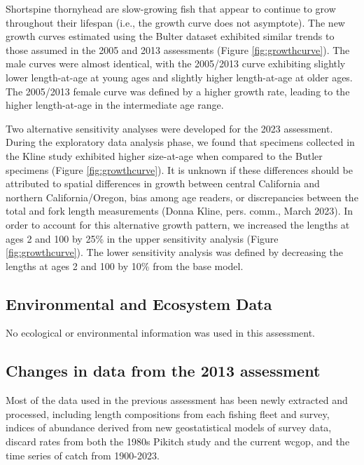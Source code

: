\documentclass[11pt,
  letterpaper,
]{article}
\begin{document}
Shortspine thornyhead are slow-growing fish that appear to continue to grow throughout their lifespan (i.e., the growth curve does not asymptote). The new growth curves estimated using the Bulter dataset exhibited similar trends to those assumed in the 2005 and 2013 assessments (Figure \ref{fig:growthcurve}). The male curves were almost identical, with the 2005/2013 curve exhibiting slightly lower length-at-age at young ages and slightly higher length-at-age at older ages. The 2005/2013 female curve was defined by a higher growth rate, leading to the higher length-at-age in the intermediate age range.

Two alternative sensitivity analyses were developed for the 2023 assessment. During the exploratory data analysis phase, we found that specimens collected in the Kline study exhibited higher size-at-age when compared to the Butler specimens (Figure \ref{fig:growthcurve}). It is unknown if these differences should be attributed to spatial differences in growth between central California and northern California/Oregon, bias among age readers, or discrepancies between the total and fork length measurements (Donna Kline, pers. comm., March 2023). In order to account for this alternative growth pattern, we increased the lengths at ages 2 and 100 by 25\% in the upper sensitivity analysis (Figure \ref{fig:growthcurve}). The lower sensitivity analysis was defined by decreasing the lengths at ages 2 and 100 by 10\% from the base model.

\hypertarget{environmental-and-ecosystem-data}{%
\subsection{Environmental and Ecosystem Data}\label{environmental-and-ecosystem-data}}

No ecological or environmental information was used in this assessment.

\hypertarget{changes-in-data-from-the-2013-assessment}{%
\subsection{Changes in data from the 2013 assessment}\label{changes-in-data-from-the-2013-assessment}}

Most of the data used in the previous assessment has been newly extracted and processed, including length compositions from each fishing fleet and survey, indices of abundance derived from new geostatistical models of survey data, discard rates from both the 1980s Pikitch study and the current \gls{wcgop}, and the time series of catch from 1900-2023.
\end{document}
